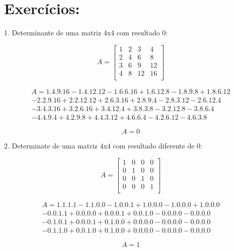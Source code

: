 \documentclass{article}
\begin{document}
\section {Exercícios:}

1. Determinante de uma matriz 4x4 com resultado 0:\newline

\[
A = 
\left[
    \begin{array}{cccc}
        1 & 2 & 3 & 4 \\
        2 & 4 & 6 & 8 \\
        3 & 6 & 9 & 12\\
        4 & 8 & 12 & 16\\
    \end{array}
\right]
\]

\begin{equation*}
\begin{split}
    A = 1.4.9.16 - 1.4.12.12 - 1.6.6.16 + 1.6.12.8 - 1.8.9.8 + 1.8.6.12\\ 
    - 2.2.9.16 + 2.2.12.12 + 2.6.3.16 + 2.8.9.4- 2.8.3.12 - 2.6.12.4\\
    - 3.4.3.16 + 3.2.6.16 + 3.4.12.4 + 3.8.3.8 - 3.2.12.8 - 3.8.6.4\\ 
    - 4.4.9.4 + 4.2.9.8 + 4.4.3.12 + 4.6.6.4 - 4.2.6.12 - 4.6.3.8
\end{split}
\end{equation*}

\[
A = 0
\]

\newpage

2. Determinate de uma matriz 4x4 com resultado diferente de 0:\newline

\[
A = 
\left[
    \begin{array}{cccc}
        1 & 0 & 0 & 0 \\
        0 & 1 & 0 & 0 \\
        0 & 0 & 1 & 0\\
        0 & 0 & 0 & 1\\
    \end{array}
\right]
\]

\begin{equation*}
    \begin{split}   
    A = 1.1.1.1 - 1.1.0.0 - 1.0.0.1 + 1.0.0.0 - 1.0.0.0 + 1.0.0.0\\
    - 0.0.1.1 + 0.0.0.0 + 0.0.0.1 + 0.0.1.0 - 0.0.0.0  - 0.0.0.0\\
    - 0.1.0.1 + 0.0.0.1 + 0.1.0.0 + 0.0.0.0 - 0.0.0.0 - 0.0.0.0\\
    - 0.1.1.0 + 0.0.1.0 + 0.1.0.0 + 0.0.0.0 - 0.0.0.0 -0.0.0.0
\end{split}
\end{equation*}

\[
A = 1  
\]
\end{document}
